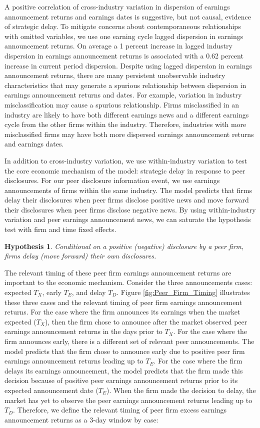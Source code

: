\documentclass[ecta,nameyear,draft]{econsocart}
\theoremstyle{theorem}
\newtheorem{hypothesis}{Hypothesis}
\numberwithin{lemma}{section}
\numberwithin{proposition}{section}
\numberwithin{equation}{section}
\numberwithin{figure}{section}
\begin{document}
A positive correlation of cross-industry variation in dispersion of earnings announcement returns and earnings dates is suggestive, but not causal, evidence of strategic delay. To mitigate concerns about contemporaneous relationships with omitted variables, we use one earning cycle lagged dispersion in earnings announcement returns. On average a 1 percent increase in lagged industry dispersion in earnings announcement returns is associated with a 0.62 percent increase in current period dispersion. Despite using lagged dispersion in earnings announcement returns, there are many persistent unobservable industry characteristics that may generate a spurious relationship between dispersion in earnings announcement returns and dates. For example, variation in industry misclassification may cause a spurious relationship. Firms misclassified in an industry are likely to have both different earnings news and a different earnings cycle from the other firms within the industry. Therefore, industries with more misclassified firms may have both more dispersed earnings announcement returns and earnings dates. 

In addition to cross-industry variation, we use within-industry variation to test the core economic mechanism of the model: strategic delay in response to peer disclosures. For our peer disclosure information event, we use earnings announcements of firms within the same industry. The model predicts that firms delay their disclosures when peer firms disclose positive news and move forward their disclosures when peer firms disclose negative news. By using within-industry variation and peer earnings announcement news, we can saturate the hypothesis test with firm and time fixed effects. 

\begin{hypothesis}\label{hyp:withinindustry}
Conditional on a positive (negative) disclosure by a peer firm, firms delay (move forward) their own disclosures.
\end{hypothesis}

The relevant timing of these peer firm earnings announcement returns are important to the economic mechanism. Consider the three announcements cases: expected $T_{X}$, early $T_{E}$, and delay $T_{D}$. Figure \ref{fig:Peer_Firm_Timing} illustrates these three cases and the relevant timing of peer firm earnings announcement returns. For the case where the firm announces its earnings when the market expected ($T_{X}$), then the firm chose to announce after the market observed peer earnings announcement returns in the days prior to $T_{X}$. For the case where the firm announces early, there is a different set of relevant peer announcements. The model predicts that the firm chose to announce early due to positive peer firm earnings announcement returns leading up to $T_{E}$. For the case where the firm delays its earnings announcement, the model predicts that the firm made this decision because of positive peer earnings announcement returns prior to its expected announcement date ($T_{E}$). When the firm made the decision to delay, the market has yet to observe the peer earnings announcement returns leading up to $T_{D}$. Therefore, we define the relevant timing of peer firm excess earnings announcement returns as a 3-day window by case:
\end{document}

